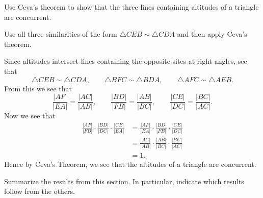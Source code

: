\documentclass[newpage,hints,handout]{ximera}
\begin{document}
\begin{problem}
Use Ceva's theorem to show that the three lines containing altitudes
of a triangle are concurrent.
\begin{image}
\end{image}
\begin{hint}
Use all three similarities of the form $\triangle CEB\sim\triangle
CDA$ and then apply Ceva's theorem.
\end{hint}
\begin{freeResponse}
Since altitudes intersect lines containing the opposite sites at right
angles, see that 
\[
\triangle CEB\sim\triangle CDA,\qquad 
\triangle BFC \sim \triangle BDA,\qquad
\triangle AFC \sim \triangle AEB.
\]
From this we see that 
\[
\frac{|AF|}{|EA|}=\frac{|AC|}{|AB|},\qquad
\frac{|BD|}{|FB|}=\frac{|AB|}{|BC|},\qquad
\frac{|CE|}{|DC|}=\frac{|BC|}{|AC|}.
\]
Now we see that 
\begin{align*}
\frac{|AF|}{|FB|}\cdot\frac{|BD|}{|DC|}\cdot\frac{|CE|}{|EA|} &= 
\frac{|AF|}{|EA|}\cdot\frac{|BD|}{|FB|}\cdot\frac{|CE|}{|DC|}\\
&=\frac{|AC|}{|AB|}\cdot\frac{|AB|}{|BC|}\cdot\frac{|BC|}{|AC|}\\
&= 1.
\end{align*}
Hence by Ceva's Theorem, we see that the altitudes of a triangle are
concurrent.
\end{freeResponse}
\end{problem}

\begin{problem}
Summarize the results from this section. In particular, indicate which
results follow from the others.
\begin{freeResponse}
\end{freeResponse}
\end{problem}
\end{document}
